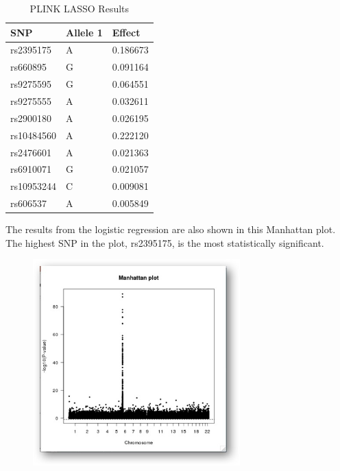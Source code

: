 \documentclass{article}
\begin{document}
\begin{table}[h]
\centering
\caption{PLINK LASSO Results}
\label{my-label}
\begin{tabular}{@{}lll@{}}
\toprule
SNP        & Allele 1 & Effect   \\ \midrule
rs2395175  & A        & 0.186673 \\
rs660895   & G        & 0.091164 \\
rs9275595  & G        & 0.064551 \\
rs9275555  & A        & 0.032611 \\
rs2900180  & A        & 0.026195 \\
rs10484560 & A        & 0.222120 \\
rs2476601  & A        & 0.021363 \\
rs6910071  & G        & 0.021057 \\
rs10953244 & C        & 0.009081 \\
rs606537   & A        & 0.005849 \\ \bottomrule
\end{tabular}
\end{table}

The results from the logistic regression are also shown in this Manhattan plot.
The highest SNP in the plot, rs2395175, is the most statistically significant.

\begin{figure}[h]
    \includegraphics[width=8cm]{figure_1}
    \centering
\end{figure}






\end{document}
